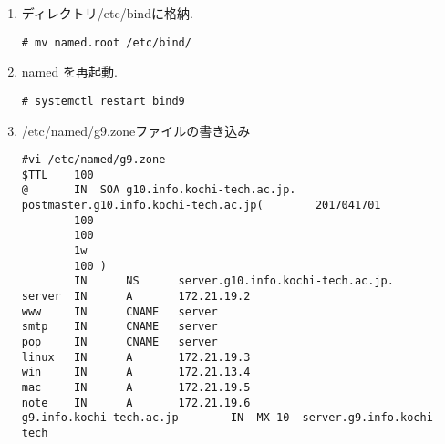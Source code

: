 \documentclass[a4j,titlepage]{jarticle}
\begin{document}
\begin{enumerate}
\begin{center}
\begin{screen}
\begin{verbatim}
\end{verbatim}
  \end{screen}
\end{center}
\item ディレクトリ/etc/bindに格納.
\begin{center}
  \begin{screen}
\begin{verbatim}
# mv named.root /etc/bind/
\end{verbatim}
  \end{screen}
\end{center}
\item named を再起動.
  

\begin{center}
  \begin{screen}
\begin{verbatim}
# systemctl restart bind9
\end{verbatim}
  \end{screen}
\end{center}

\item /etc/named/g9.zoneファイルの書き込み

\begin{center}
  \begin{screen}
\begin{verbatim}
#vi /etc/named/g9.zone
$TTL    100
@       IN  SOA g10.info.kochi-tech.ac.jp. postmaster.g10.info.kochi-tech.ac.jp(        2017041701 
        100 
        100 
        1w
        100 )
        IN      NS      server.g10.info.kochi-tech.ac.jp.
server  IN      A       172.21.19.2
www     IN      CNAME   server
smtp    IN      CNAME   server
pop     IN      CNAME   server
linux   IN      A       172.21.19.3
win     IN      A       172.21.13.4
mac     IN      A       172.21.19.5
note    IN      A       172.21.19.6
g9.info.kochi-tech.ac.jp        IN  MX 10  server.g9.info.kochi-tech
\end{verbatim}
  \end{screen}
\end{center}


\end{enumerate}
\end{document}
